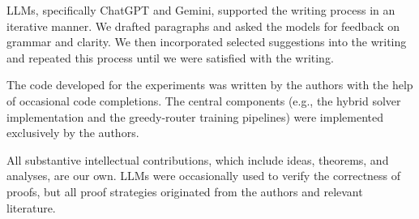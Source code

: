 \documentclass{article} %
\begin{document}
LLMs, specifically ChatGPT and Gemini, supported the writing process in an iterative manner. We drafted paragraphs and asked the models for feedback on grammar and clarity. We then incorporated selected suggestions into the writing and repeated this process until we were satisfied with the writing. 

The code developed for the experiments was written by the authors with the help of occasional code completions. The central components (e.g., the hybrid solver implementation and the greedy-router training pipelines) were implemented exclusively by the authors.

All substantive intellectual contributions, which include ideas, theorems, and analyses, are our own. LLMs were occasionally used to verify the correctness of proofs, but all proof strategies originated from the authors and relevant literature.
\end{document}
